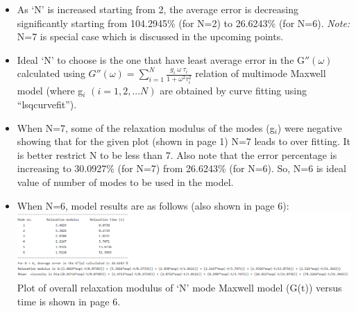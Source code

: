 \documentclass[a4paper,12pt]{report}
\begin{document}
\begin{itemize}
    \item As `N' is increased starting from 2, the average error is decreasing significantly starting from 104.2945\% (for N=2) to 26.6243\% (for N=6). \textit{Note:} N=7 is special case which is discussed in the upcoming points.
    \item Ideal `N' to choose is the one that have least average error in the G$''(\omega)$ calculated using $G''(\omega)=\sum_{i=1}^N \frac{g_i\ \omega\ \tau_i}{1+\omega^2\tau_i^2}$ relation of multimode Maxwell model (where g$_i$ $(i=1,2,...N)$ are obtained by curve fitting using ``lsqcurvefit'').
    \item When N=7, some of the relaxation modulus of the modes (g$_i$) were negative showing that for the given plot (shown in page 1) N=7 leads to over fitting. It is better restrict N to be less than 7. Also note that the error percentage is increasing to 30.0927\% (for N=7) from 26.6243\% (for N=6). So, N=6 is ideal value of number of modes to be used in the model.
    \item When N=6, model results are as follows (also shown in page 6):\\[0.35cm]
    \includegraphics[scale=0.75]{Results_Conclusion.png}
    \\[0.35cm]Plot of overall relaxation modulus of `N' mode Maxwell model (G(t)) versus time is shown in page 6.
\end{itemize}
\end{document}
